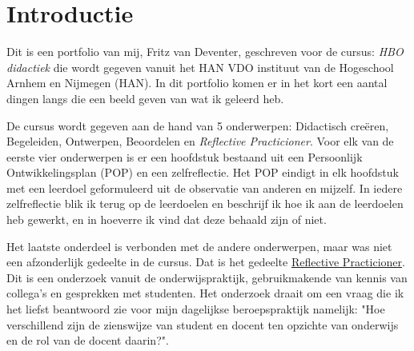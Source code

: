 
\section{Introductie}
Dit is een portfolio van mij, Fritz van Deventer, geschreven voor de cursus: \textit{HBO didactiek} die wordt gegeven vanuit het HAN VDO instituut van de Hogeschool Arnhem en Nijmegen (HAN).
In dit portfolio komen er in het kort een aantal dingen langs die een beeld geven van wat ik geleerd heb.

De cursus wordt gegeven aan de hand van 5 onderwerpen: Didactisch creëren, Begeleiden, Ontwerpen, Beoordelen en \textit{Reflective Practicioner}. Voor elk van de eerste vier onderwerpen is er een hoofdstuk bestaand uit een Persoonlijk Ontwikkelingsplan (POP) en een zelfreflectie. Het POP eindigt in elk hoofdstuk met een leerdoel geformuleerd uit de observatie van anderen en mijzelf. In iedere zelfreflectie blik ik terug op de leerdoelen en beschrijf ik hoe ik aan de leerdoelen heb gewerkt, en in hoeverre ik vind dat deze behaald zijn of niet.

Het laatste onderdeel is verbonden met de andere onderwerpen, maar was niet een afzonderlijk gedeelte in de cursus. Dat is het gedeelte \hyperref[sec:RP]{Reflective Practicioner}. Dit is een onderzoek vanuit de onderwijspraktijk, gebruikmakende van kennis van collega's en gesprekken met studenten. Het onderzoek draait om een vraag die ik het liefst beantwoord zie voor mijn dagelijkse beroepspraktijk namelijk: "Hoe verschillend zijn de zienswijze van student en docent ten opzichte van onderwijs en de rol van de docent daarin?".

